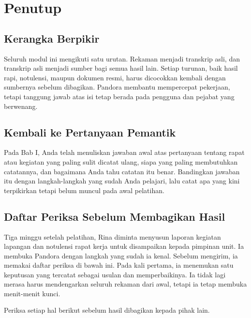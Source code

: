 \chapter{Penutup}

\section{Kerangka Berpikir}
Seluruh modul ini mengikuti satu urutan. Rekaman menjadi transkrip asli, dan transkrip asli menjadi sumber bagi semua hasil lain. Setiap turunan, baik hasil rapi, notulensi, maupun dokumen resmi, harus dicocokkan kembali dengan sumbernya sebelum dibagikan. Pandora membantu mempercepat pekerjaan, tetapi tanggung jawab atas isi tetap berada pada pengguna dan pejabat yang berwenang.

\section{Kembali ke Pertanyaan Pemantik}
Pada Bab I, Anda telah menuliskan jawaban awal atas pertanyaan tentang rapat atau kegiatan yang paling sulit dicatat ulang, siapa yang paling membutuhkan catatannya, dan bagaimana Anda tahu catatan itu benar. Bandingkan jawaban itu dengan langkah-langkah yang sudah Anda pelajari, lalu catat apa yang kini terpikirkan tetapi belum muncul pada awal pelatihan.

\section{Daftar Periksa Sebelum Membagikan Hasil}
\begin{ilustrasi}
Tiga minggu setelah pelatihan, Rina diminta menyusun laporan kegiatan lapangan dan notulensi rapat kerja untuk disampaikan kepada pimpinan unit. Ia membuka Pandora dengan langkah yang sudah ia kenal. Sebelum mengirim, ia memakai daftar periksa di bawah ini. Pada kali pertama, ia menemukan satu keputusan yang tercatat sebagai usulan dan memperbaikinya. Ia tidak lagi merasa harus mendengarkan seluruh rekaman dari awal, tetapi ia tetap membuka menit-menit kunci.
\end{ilustrasi}

Periksa setiap hal berikut sebelum hasil dibagikan kepada pihak lain.

